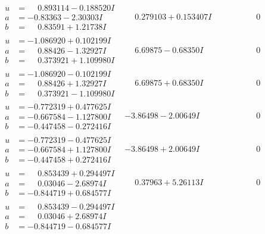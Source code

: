 \documentclass[1p]{elsarticle_modified}
\theoremstyle{definition}
\begin{document}
$$\begin{array}{c|c|c}
\begin{aligned}
u &= \phantom{-}0.893114 - 0.188520 I \\
a &= -0.83363 - 2.30303 I \\
b &= \phantom{-}0.83591 + 1.21738 I\end{aligned}
 & \phantom{-}0.279103 + 0.153407 I & \phantom{-0.000000 } 0 \\ \hline\begin{aligned}
u &= -1.086920 + 0.102199 I \\
a &= \phantom{-}0.88426 - 1.32927 I \\
b &= \phantom{-}0.373921 + 1.109980 I\end{aligned}
 & \phantom{-}6.69875 - 0.68350 I & \phantom{-0.000000 } 0 \\ \hline\begin{aligned}
u &= -1.086920 - 0.102199 I \\
a &= \phantom{-}0.88426 + 1.32927 I \\
b &= \phantom{-}0.373921 - 1.109980 I\end{aligned}
 & \phantom{-}6.69875 + 0.68350 I & \phantom{-0.000000 } 0 \\ \hline\begin{aligned}
u &= -0.772319 + 0.477625 I \\
a &= -0.667584 - 1.127800 I \\
b &= -0.447458 - 0.272416 I\end{aligned}
 & -3.86498 - 2.00649 I & \phantom{-0.000000 } 0 \\ \hline\begin{aligned}
u &= -0.772319 - 0.477625 I \\
a &= -0.667584 + 1.127800 I \\
b &= -0.447458 + 0.272416 I\end{aligned}
 & -3.86498 + 2.00649 I & \phantom{-0.000000 } 0 \\ \hline\begin{aligned}
u &= \phantom{-}0.853439 + 0.294497 I \\
a &= \phantom{-}0.03046 - 2.68974 I \\
b &= -0.844719 + 0.684577 I\end{aligned}
 & \phantom{-}0.37963 + 5.26113 I & \phantom{-0.000000 } 0 \\ \hline\begin{aligned}
u &= \phantom{-}0.853439 - 0.294497 I \\
a &= \phantom{-}0.03046 + 2.68974 I \\
b &= -0.844719 - 0.684577 I\end{aligned}

\end{array}$$
\end{document}
